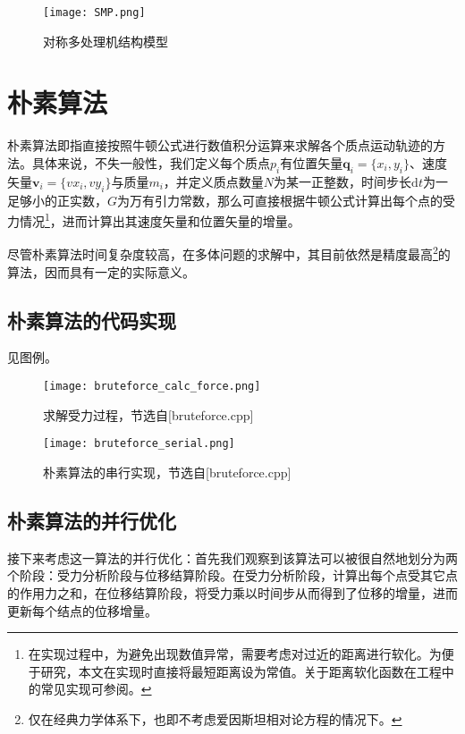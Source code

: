 \documentclass[lang=cn,11pt,a4paper,cite=authoryear]{elegantpaper}
\begin{document}
\begin{figure}[htbp]
  \centering
  \texttt{[image: SMP.png]}
  \caption{对称多处理机结构模型}
\end{figure}

\newpage

\section{朴素算法}

朴素算法即指直接按照牛顿公式进行数值积分运算来求解各个质点运动轨迹的方法。具体来说，不失一般性，我们定义每个质点$p_i$有位置矢量$\mathbf q_i=\{x_i,y_i\}$、速度矢量$\mathbf v_i=\{vx_i,vy_i\}$与质量$m_i$，并定义质点数量$N$为某一正整数，时间步长$\mathrm dt$为一足够小的正实数，$G$为万有引力常数，那么可直接根据牛顿公式计算出每个点的受力情况\footnote{在实现过程中，为避免出现数值异常，需要考虑对过近的距离进行软化。为便于研究，本文在实现时直接将最短距离设为常值。关于距离软化函数在工程中的常见实现可参阅\cite{en1}。}，进而计算出其速度矢量和位置矢量的增量。

尽管朴素算法时间复杂度较高，在多体问题的求解中，其目前依然是精度最高\footnote{仅在经典力学体系下，也即不考虑爱因斯坦相对论方程的情况下。}的算法，因而具有一定的实际意义。

\subsection{朴素算法的代码实现}

见图例。

\begin{figure}[htbp]
  \centering
  \texttt{[image: bruteforce\_calc\_force.png]}
  \caption{求解受力过程，节选自[bruteforce.cpp]}
\end{figure}

\begin{figure}[htbp]
  \centering
  \texttt{[image: bruteforce\_serial.png]}
  \caption{朴素算法的串行实现，节选自[bruteforce.cpp]}
\end{figure}

\subsection{朴素算法的并行优化}

接下来考虑这一算法的并行优化：首先我们观察到该算法可以被很自然地划分为两个阶段：受力分析阶段与位移结算阶段。在受力分析阶段，计算出每个点受其它点的作用力之和，在位移结算阶段，将受力乘以时间步从而得到了位移的增量，进而更新每个结点的位移增量。
\end{document}
